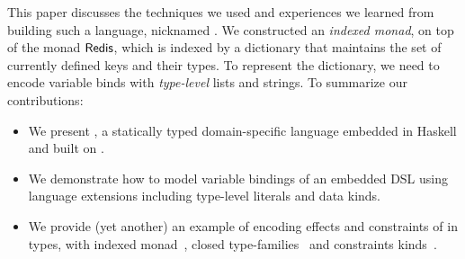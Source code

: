 This paper discusses the techniques we used and experiences we learned from building such a language, nicknamed \Popcorn{}. We constructed an {\em indexed
monad}, on top of the monad \ensuremath{\Conid{Redis}}, which is indexed by a dictionary that
maintains the set of currently defined keys and their types. To represent
the dictionary, we need to encode variable binds with {\em type-level} lists
and strings. To summarize our contributions:
\begin{itemize}
\item We present \Popcorn{}, a statically typed domain-specific language embedded in Haskell and built on \Hedis{}.
%
\item We demonstrate how to model variable bindings of an embedded DSL using
 language extensions including type-level literals and data kinds.
%
\item We provide (yet another) an example of encoding effects and constraints of
in types, with indexed monad~\cite{indexedmonad}, closed type-families~\cite{closedtypefamilies} and constraints kinds~\cite{constraintskinds}.
\end{itemize}
